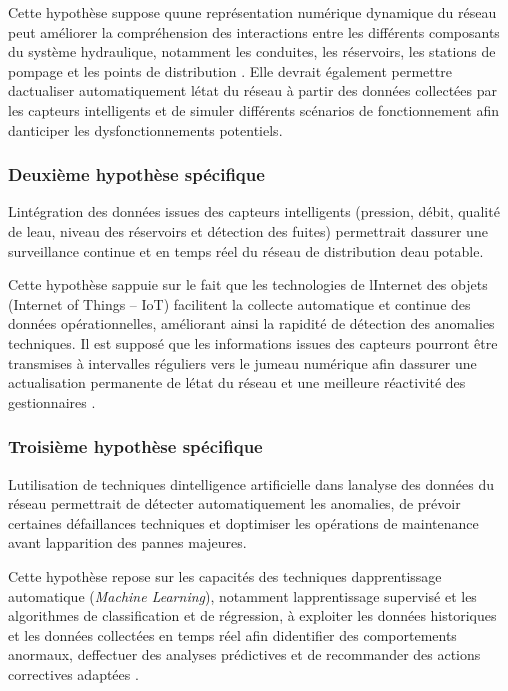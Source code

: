 \documentclass[12pt,a4paper,oneside]{report}
\begin{document}
Cette hypothèse suppose qu\textquotesingle une représentation numérique
dynamique du réseau peut améliorer la compréhension des interactions
entre les différents composants du système hydraulique, notamment les
conduites, les réservoirs, les stations de pompage et les points de
distribution \cite{ref8}. Elle devrait également permettre
d\textquotesingle actualiser automatiquement l\textquotesingle état du
réseau à partir des données collectées par les capteurs intelligents et
de simuler différents scénarios de fonctionnement afin
d\textquotesingle anticiper les dysfonctionnements potentiels.

\subsubsection{Deuxième hypothèse
spécifique}\label{deuxiuxe8me-hypothuxe8se-spuxe9cifique}

L\textquotesingle intégration des données issues des capteurs
intelligents (pression, débit, qualité de l\textquotesingle eau, niveau
des réservoirs et détection des fuites) permettrait
d\textquotesingle assurer une surveillance continue et en temps réel du
réseau de distribution d\textquotesingle eau potable.

Cette hypothèse s\textquotesingle appuie sur le fait que les
technologies de l\textquotesingle Internet des objets (Internet of
Things -- IoT) facilitent la collecte automatique et continue des
données opérationnelles, améliorant ainsi la rapidité de détection des
anomalies techniques. Il est supposé que les informations issues des
capteurs pourront être transmises à intervalles réguliers vers le jumeau
numérique afin d\textquotesingle assurer une actualisation permanente de
l\textquotesingle état du réseau et une meilleure réactivité des
gestionnaires \cite{ref7}.

\subsubsection{Troisième hypothèse
spécifique}\label{troisiuxe8me-hypothuxe8se-spuxe9cifique}

L\textquotesingle utilisation de techniques
d\textquotesingle intelligence artificielle dans
l\textquotesingle analyse des données du réseau permettrait de détecter
automatiquement les anomalies, de prévoir certaines défaillances
techniques et d\textquotesingle optimiser les opérations de maintenance
avant l\textquotesingle apparition des pannes majeures.

Cette hypothèse repose sur les capacités des techniques
d\textquotesingle apprentissage automatique (\emph{Machine Learning}),
notamment l\textquotesingle apprentissage supervisé et les algorithmes
de classification et de régression, à exploiter les données historiques
et les données collectées en temps réel afin
d\textquotesingle identifier des comportements anormaux,
d\textquotesingle effectuer des analyses prédictives et de recommander
des actions correctives adaptées \cite{ref21}.
\end{document}
